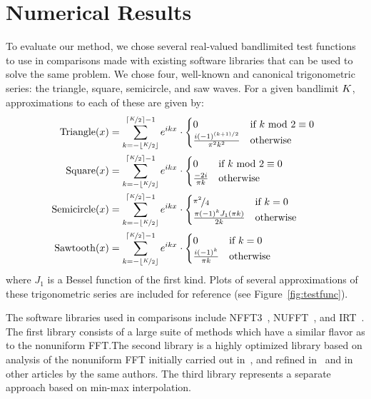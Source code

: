 \section{Numerical Results}

To evaluate our method, we chose several real-valued bandlimited test
functions to use in comparisons made with existing software libraries
that can be used to solve the same problem. We chose four, well-known
and canonical trigonometric series: the triangle, square, semicircle,
and saw waves. For a given bandlimit $K{}$, approximations to
each of these are given by:
\begin{align}
  \operatorname{Triangle}(x) &= \sum_{{k}=-\left\lfloor\nicefrac{K}{2}\right\rfloor}^{\left\lceil\nicefrac{K}{2}\right\rceil{}-1} e^{ik{x}_{}} \cdot \begin{cases}  0 & \mbox{if } k{} \mbox{ mod } 2 \equiv 0 \\ \frac{i{(-1)}^{(k{}+1)/2}}{\pi{}^2k{}^2} & \mbox{otherwise} \end{cases} \ \label{eq:triangle} \\
  \operatorname{Square}(x) &= \sum_{{k}=-\left\lfloor\nicefrac{K}{2}\right\rfloor}^{\left\lceil\nicefrac{K}{2}\right\rceil{}-1} e^{ik{x}_{}} \cdot \begin{cases} 0 & \mbox{if } k{} \mbox{ mod } 2 \equiv 0 \\ \frac{-2i}{\pi{}k{}} & \mbox{otherwise} \end{cases} \label{eq:square} \\
  \operatorname{Semicircle}(x) &= \sum_{{k}=-\left\lfloor\nicefrac{K}{2}\right\rfloor}^{\left\lceil\nicefrac{K}{2}\right\rceil{}-1} e^{ik{x}_{}} \cdot \begin{cases} \nicefrac{\pi^2}{4} & \mbox{if } k{} = 0 \\ \frac{\pi{}{(-1)}^k{} J_1(\pi{}k{})}{2k{}} & \mbox{otherwise} \end{cases} \label{eq:semicircle} \\
  \operatorname{Sawtooth}(x) &= \sum_{{k}=-\left\lfloor\nicefrac{K}{2}\right\rfloor}^{\left\lceil\nicefrac{K}{2}\right\rceil{}-1} e^{ik{x}_{}} \cdot \begin{cases} 0 & \mbox{if } k = 0 \\ \frac{i{(-1)}^k}{\pi k} & \mbox{otherwise} \end{cases} \label{eq:sawtooth}
\end{align}
where $J_1$ is a Bessel function of the first kind. Plots of several approximations of these trigonometric series are included for reference (see Figure~\ref{fig:testfunc}).

The software libraries used in comparisons include
NFFT3~\cite{using-nfft3}, NUFFT~\cite{accelerating-nufft,
  type3-nufft-apps}, and IRT~\cite{Fessler:2003dz}. The first library
consists of a large suite of methods which have a similar flavor as to
the nonuniform FFT.\@ The second library is a highly optimized library
based on analysis of the nonuniform FFT initially carried out
in~\cite{dutt-rokhlin-nufft-I}, and refined
in~\cite{accelerating-nufft, type3-nufft-apps} and in other articles
by the same authors. The third library represents a separate approach
based on min-max interpolation.

